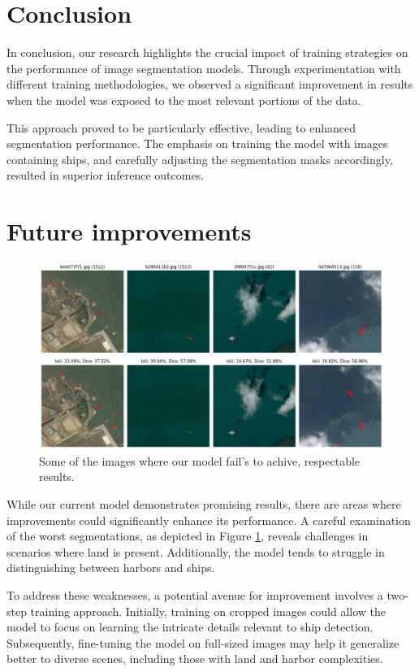 \documentclass{article}
\begin{document}
\section{Conclusion}


In conclusion, our research highlights the crucial impact of training strategies on the performance of image segmentation
models. Through experimentation with different training methodologies, we observed a significant improvement in results when
the model was exposed to the most relevant portions of the data.

This approach proved to be particularly effective, leading to enhanced segmentation performance. The emphasis on training the model
with images containing ships, and carefully adjusting the segmentation masks accordingly, resulted in superior inference outcomes.


\section{Future improvements}


\begin{figure}[!hb]
  \centering
  \includegraphics[width=\textwidth]{bad-segmentations}
  \caption{
    Some of the images where our model fail's to achive,
    respectable results.
  }
  \label{fig:bad-segmentations}
\end{figure}

While our current model demonstrates promising results, there are areas where improvements could significantly enhance its
performance. A careful examination of the worst segmentations, as depicted in Figure \ref{fig:bad-segmentations}, reveals
challenges in scenarios where land is present. Additionally, the model tends to struggle in distinguishing between
harbors and ships.

To address these weaknesses, a potential avenue for improvement involves a two-step training approach. Initially, training
on cropped images could allow the model to focus on learning the intricate details relevant to ship detection. Subsequently,
fine-tuning the model on full-sized images may help it generalize better to diverse scenes, including those with land and harbor
complexities.
\end{document}
